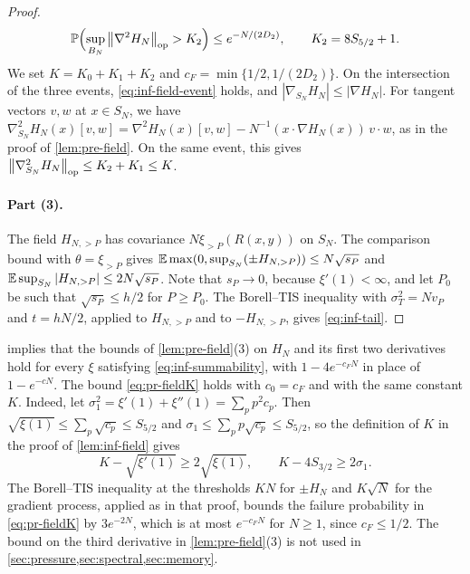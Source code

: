\begin{proof}
\begin{equation*}
\mathbb P\Bigl(\sup_{B_N}\left\lVert\nabla^2H_N\right\rVert_{\mathrm{op}}>K_2\Bigr)\le e^{-N/(2D_2)},\qquad K_2=8S_{5/2}+1.
\end{equation*}
We set $K=K_0+K_1+K_2$ and $c_F=\min\{1/2,1/(2D_2)\}$. On the intersection of the three events, \eqref{eq:inf-field-event} holds, and $|\nabla_{S_N}H_N|\le|\nabla H_N|$. For tangent vectors $v,w$ at $x\in S_N$, we have $\nabla^2_{S_N}H_N(x)[v,w]=\nabla^2H_N(x)[v,w]-N^{-1}(x\cdot\nabla H_N(x))\,v\cdot w$, as in the proof of \cref{lem:pre-field}. On the same event, this gives $\left\lVert\nabla^2_{S_N}H_N\right\rVert_{\mathrm{op}}\le K_2+K_1\le K$.

\paragraph{Part (3).} The field $H_{N,>P}$ has covariance $N\xi_{>P}(R(x,y))$ on $S_N$. The comparison bound with $\theta=\xi_{>P}$ gives $\mathbb E\max(0,\sup_{S_N}(\pm H_{N,>P}))\le N\sqrt{s_P}$ and $\mathbb E\sup_{S_N}|H_{N,>P}|\le2N\sqrt{s_P}$. Note that $s_P\to0$, because $\xi'(1)<\infty$, and let $P_0$ be such that $\sqrt{s_P}\le h/2$ for $P\ge P_0$. The Borell--TIS inequality with $\sigma_T^2=Nv_P$ and $t=hN/2$, applied to $H_{N,>P}$ and to $-H_{N,>P}$, gives \eqref{eq:inf-tail}.
\end{proof}

 implies that the bounds of \cref{lem:pre-field}(3) on $H_N$ and its first two derivatives hold for every $\xi$ satisfying \eqref{eq:inf-summability}, with $1-4e^{-c_FN}$ in place of $1-e^{-cN}$. The bound \eqref{eq:pr-fieldK} holds with $c_0=c_F$ and with the same constant $K$. Indeed, let $\sigma_1^2=\xi'(1)+\xi''(1)=\sum_pp^2c_p$. Then $\sqrt{\xi(1)}\le\sum_p\sqrt{c_p}\le S_{5/2}$ and $\sigma_1\le\sum_pp\sqrt{c_p}\le S_{5/2}$, so the definition of $K$ in the proof of \cref{lem:inf-field} gives
\begin{equation*}
K-\sqrt{\xi'(1)}\ge2\sqrt{\xi(1)},\qquad K-4S_{3/2}\ge2\sigma_1.
\end{equation*}
The Borell--TIS inequality at the thresholds $KN$ for $\pm H_N$ and $K\sqrt N$ for the gradient process, applied as in that proof, bounds the failure probability in \eqref{eq:pr-fieldK} by $3e^{-2N}$, which is at most $e^{-c_FN}$ for $N\ge1$, since $c_F\le1/2$. The bound on the third derivative in \cref{lem:pre-field}(3) is not used in \cref{sec:pressure,sec:spectral,sec:memory}.


